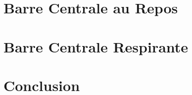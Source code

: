 \documentclass{beamer}
\begin{document}
  \section{Barre Centrale au Repos}
  \begin{frame}
  \end{frame}
  \section{Barre Centrale Respirante}
  \begin{frame}
  \end{frame}
  \section{Conclusion}
  \begin{frame}
  \end{frame}
\end{document}
